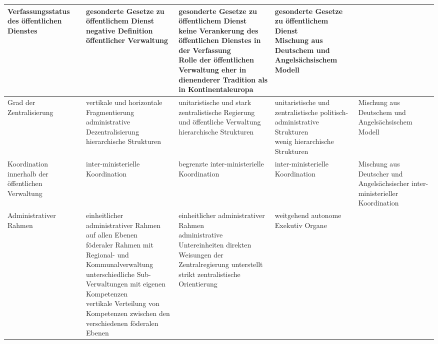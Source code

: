\begin{landscape}
\begin{scriptsize}
\begin{longtable}[H]{|L{4cm}|L{5cm}|L{5cm}|L{5cm}|L{4cm}|}
{Verfassungsstatus des öffentlichen Dienstes}
&
\parbox[t]{5cm}{gesonderte Gesetze zu öffentlichem Dienst\\
negative Definition öffentlicher Verwaltung}
&
\parbox[t]{5cm}{gesonderte Gesetze zu öffentlichem Dienst\\
keine Verankerung des öffentlichen Dienstes in der Verfassung\\
Rolle der öffentlichen Verwaltung eher in dienenderer Tradition als in Kontinentaleuropa}
&
\parbox[t]{4cm}{gesonderte Gesetze zu öffentlichem Dienst\\
Mischung aus Deutschem und Angelsächsischem Modell}
\\\hline
\parbox[t]{4cm}{Grad der Zentralisierung}
&
\parbox[t]{5cm}{vertikale und horizontale Fragmentierung\\
administrative Dezentralisierung\\
hierarchische Strukturen\\}
&
\parbox[t]{5cm}{unitaristische und stark zentralistische Regierung und öffentliche Verwaltung\\
hierarchische Strukturen}
&
\parbox[t]{5cm}{unitaristische und zentralistische politisch-administrative Strukturen\\
wenig hierarchische Strukturen}
&
\parbox[t]{4cm}{Mischung aus Deutschem und Angelsächsischem Modell}\\\hline
\parbox[t]{4cm}{Koordination innerhalb der öffentlichen Verwaltung}
&
\parbox[t]{5cm}{inter-ministerielle Koordination}
&
\parbox[t]{5cm}{begrenzte inter-ministerielle Koordination}
&
\parbox[t]{5cm}{inter-ministerielle Koordination}
&
\parbox[t]{4cm}{Mischung aus Deutscher und Angelsächsischer inter-ministerieller Koordination\\}\\\hline
\parbox[t]{4cm}{Administrativer Rahmen}
&
\parbox[t]{5cm}{einheitlicher administrativer Rahmen auf allen Ebenen\\
föderaler Rahmen mit Regional- und Kommunalverwaltung\\
unterschiedliche Sub-Verwaltungen mit eigenen Kompetenzen\\
vertikale Verteilung von Kompetenzen zwischen den verschiedenen föderalen Ebenen\\}
&
\parbox[t]{5cm}{einheitlicher administrativer Rahmen\\
administrative Untereinheiten direkten Weisungen der Zentralregierung unterstellt\\
strikt zentralistische Orientierung}
&
\parbox[t]{5cm}{weitgehend autonome Exekutiv Organe\\
}
\end{longtable}
\end{scriptsize}
\end{landscape}
